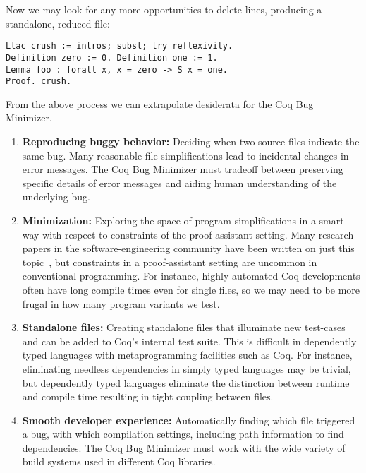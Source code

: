 \documentclass[a4paper,USenglish,cleveref,autoref,thm-restate]{lipics-v2021}
\begin{document}
Now we may look for any more opportunities to delete lines, producing a standalone, reduced file:
\begin{verbatim}
Ltac crush := intros; subst; try reflexivity.
Definition zero := 0. Definition one := 1.
Lemma foo : forall x, x = zero -> S x = one.
Proof. crush.
\end{verbatim}

From the above process we can extrapolate desiderata for the Coq Bug Minimizer.

\begin{enumerate}
\item \textbf{Reproducing buggy behavior:} Deciding when two source files indicate the same bug.
Many reasonable file simplifications lead to incidental changes in error messages.
The Coq Bug Minimizer must tradeoff between preserving specific details of error messages and aiding human understanding of the underlying bug.

\item \textbf{Minimization:} Exploring the space of program simplifications in a smart way with respect to constraints of the proof-assistant setting.
Many research papers in the software-engineering community have been written on just this topic~\cite{Cleve2000,zeller2009programs,Burger2005,delta,Zeller2002}, but constraints in a proof-assistant setting are uncommon in conventional programming.
For instance, highly automated Coq developments often have long compile times even for single files, so we may need to be more frugal in how many program variants we test.

\item \textbf{Standalone files:} Creating standalone files that illuminate new test-cases and can be added to Coq's internal test suite.
This is difficult in dependently typed languages with metaprogramming facilities such as Coq.
For instance, eliminating needless dependencies in simply typed languages may be trivial, but dependently typed languages eliminate the distinction between runtime and compile time resulting in tight coupling between files.

\item \textbf{Smooth developer experience:} Automatically finding which file triggered a bug, with which compilation settings, including path information to find dependencies.
The Coq Bug Minimizer must work with the wide variety of build systems used in different Coq libraries.


\end{enumerate}
\end{document}
